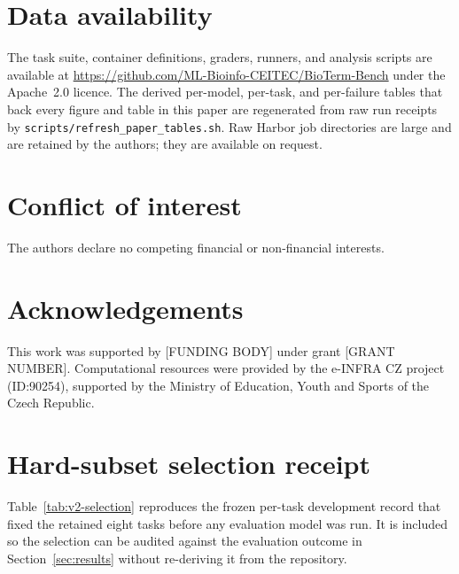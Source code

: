 \documentclass[11pt]{article}
\begin{document}
\section*{Data availability}

The task suite, container definitions, graders, runners, and analysis scripts are available at \url{https://github.com/ML-Bioinfo-CEITEC/BioTerm-Bench} under the Apache~2.0 licence.
The derived per-model, per-task, and per-failure tables that back every figure and table in this paper are regenerated from raw run receipts by \texttt{scripts/refresh\_paper\_tables.sh}.
Raw Harbor job directories are large and are retained by the authors; they are available on request.

\section*{Conflict of interest}

The authors declare no competing financial or non-financial interests.

\section*{Acknowledgements}

This work was supported by [FUNDING BODY] under grant [GRANT NUMBER]. %
Computational resources were provided by the e-INFRA CZ project (ID:90254), supported by the Ministry of Education, Youth and Sports of the Czech Republic.

{\small
\setlength{\bibsep}{2pt}


}

\appendix

\section{Hard-subset selection receipt}
\label{app:selection}

Table~\ref{tab:v2-selection} reproduces the frozen per-task development record that fixed the retained eight tasks before any evaluation model was run.
It is included so the selection can be audited against the evaluation outcome in Section~\ref{sec:results} without re-deriving it from the repository.

\begin{table}[h]
\centering
\small
\caption{Frozen retained hard-subset tasks from \texttt{notes/v2\_task\_selection.json}. Rates use only scored development attempts; errors are preserved separately and do not enter the rate denominator.}
\label{tab:v2-selection}

\end{table}
\end{document}
